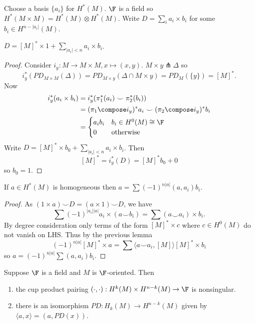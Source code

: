 \documentclass[a4paper]{article}
\newcommand*{\cp}{\smile} %
\begin{document}
Choose a basis \(\{a_i\}\) for \(H^*(M)\). \(\F\) is a field so \(H^*(M \times M) = H^*(M) \otimes H^*(M)\). Write \(D = \sum_i a_i \times b_i\) for some \(b_i \in H^{n - |a_i|}(M)\).

\begin{lemma}
  \(D = [M]^* \times 1 + \sum_{|a_i| < n} a_i \times b_i\).
\end{lemma}

\begin{proof}
  Consider \(i_y: M \to M \times M, x \mapsto (x, y)\). \(M \times y \pitchfork \Delta\) so
  \[
    i_y^*(PD_{M \times M}(\Delta)) = PD_{M \times y}(\Delta \cap M \times y) = PD_M(\{y\}) = [M]^*.
  \]
  Now
  \begin{align*}
    i_y^*(a_i \times b_i) &= i_y^*(\pi_1^*(a_i) \cp \pi_2^*(b_i)) \\
                          &= (\pi_1 \compose i_y)^* a_i \cp (\pi_2 \compose i_y)^*b_i \\
                          &=
                            \begin{cases}
                              a_i b_i & b_i \in H^0(M) \cong \F \\
                              0 & \text{otherwise}
                            \end{cases}
  \end{align*}
  Write \(D = [M]^* \times b_0 + \sum_{|a_i| < n} a_i \times b_i\). Then
  \[
    [M]^* = i_y^*(D) = [M]^* b_0 + 0
  \]
  so \(b_0 = 1\).
\end{proof}

\begin{lemma}
  \label{lem:decomposition by cup product pairing}
  If \(a \in H^*(M)\) is homogeneous then \(a = \sum (-1)^{n |a|}(a, a_i) b_i\).
\end{lemma}

\begin{proof}
  As \((1 \times a) \cp D = (a \times 1) \cp D\), we have
  \[
    \sum (-1)^{|a_i||a|} a_i \times (a \cp b_i) = \sum (a \cp a_i) \times b_i.
  \]
  By degree consideration only terms of the form \([M]^* \times c\) where \(c \in H^0(M)\) do not vanish on LHS. Thus by the previous lemma
  \[
    (-1)^{n|a|} [M]^* \times a = \sum \langle a \cp a_i, [M] \rangle [M]^* \times b_i
  \]
  so \(a = (-1)^{n|a|} \sum (a, a_i) b_i\).
\end{proof}

\begin{corollary}
  Suppose \(\F\) is a field and \(M\) is \(\F\)-oriented. Then
  \begin{enumerate}
  \item the cup product pairing \((\cdot, \cdot): H^k(M) \times H^{n - k}(M) \to \F\) is nonsingular.
  \item there is an isomorphism \(PD: H_k(M) \to H^{n - k}(M)\) given by \(\langle a, x \rangle = (a, PD(x))\).
  \end{enumerate}
\end{corollary}
\end{document}
